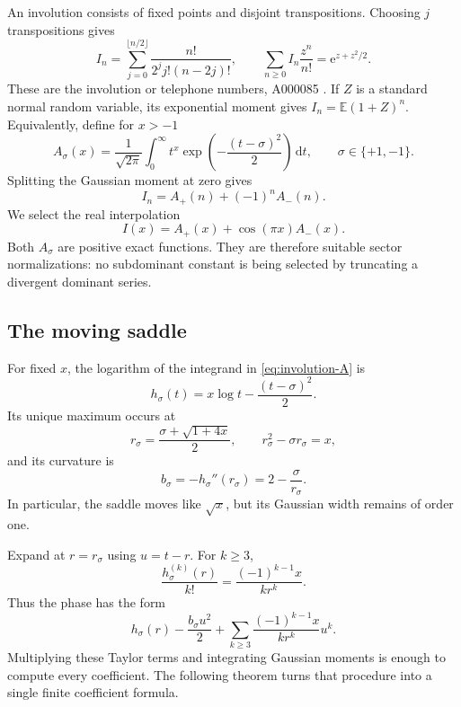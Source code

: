 \documentclass[11pt,a4paper]{article}
\numberwithin{equation}{section}
\theoremstyle{definition}
\theoremstyle{remark}
\newcommand{\dd}{\,\mathrm d}
\newcommand{\ee}{\mathrm e}
\begin{document}
An involution consists of fixed points and disjoint transpositions. Choosing $j$ transpositions gives
\begin{equation}
 I_n=\sum_{j=0}^{\lfloor n/2\rfloor}
        \frac{n!}{2^jj!(n-2j)!},\qquad
 \sum_{n\ge0}I_n\frac{z^n}{n!}=\ee^{z+z^2/2}.
 \label{eq:involution-enumeration}
\end{equation}
These are the involution or telephone numbers, A000085 \cite{oeisinvolution}. If $Z$ is a standard normal random variable, its exponential moment gives $I_n=\mathbb E(1+Z)^n$. Equivalently, define for $x>-1$
\begin{equation}
 A_\sigma(x)=\frac1{\sqrt{2\pi}}\int_0^\infty
          t^x\exp\!\left(-\frac{(t-\sigma)^2}{2}\right)\dd t,
 \qquad \sigma\in\{+1,-1\}.
 \label{eq:involution-A}
\end{equation}
Splitting the Gaussian moment at zero gives
\begin{equation}
 I_n=A_+(n)+(-1)^nA_-(n).
 \label{eq:involution-exact-lattice}
\end{equation}
We select the real interpolation
\begin{equation}
 I(x)=A_+(x)+\cos(\pi x)A_-(x).
 \label{eq:involution-cont}
\end{equation}
Both $A_\sigma$ are positive exact functions. They are therefore suitable sector normalizations: no subdominant constant is being selected by truncating a divergent dominant series.

\subsection{The moving saddle}

For fixed $x$, the logarithm of the integrand in \eqref{eq:involution-A} is
\[
 h_\sigma(t)=x\log t-\frac{(t-\sigma)^2}{2}.
\]
Its unique maximum occurs at
\begin{equation}
 r_\sigma=\frac{\sigma+\sqrt{1+4x}}2,
 \qquad r_\sigma^2-\sigma r_\sigma=x,
 \label{eq:involution-saddle}
\end{equation}
and its curvature is
\begin{equation}
 b_\sigma=-h_\sigma''(r_\sigma)
          =2-\frac{\sigma}{r_\sigma}.
 \label{eq:involution-curvature}
\end{equation}
In particular, the saddle moves like $\sqrt x$, but its Gaussian width remains of order one.

Expand at $r=r_\sigma$ using $u=t-r$. For $k\ge3$,
\[
 \frac{h_\sigma^{(k)}(r)}{k!}
       =\frac{(-1)^{k-1}x}{kr^k}.
\]
Thus the phase has the form
\[
 h_\sigma(r)-\frac{b_\sigma u^2}{2}
       +\sum_{k\ge3}\frac{(-1)^{k-1}x}{kr^k}u^k.
\]
Multiplying these Taylor terms and integrating Gaussian moments is enough to compute every coefficient. The following theorem turns that procedure into a single finite coefficient formula.
\end{document}
